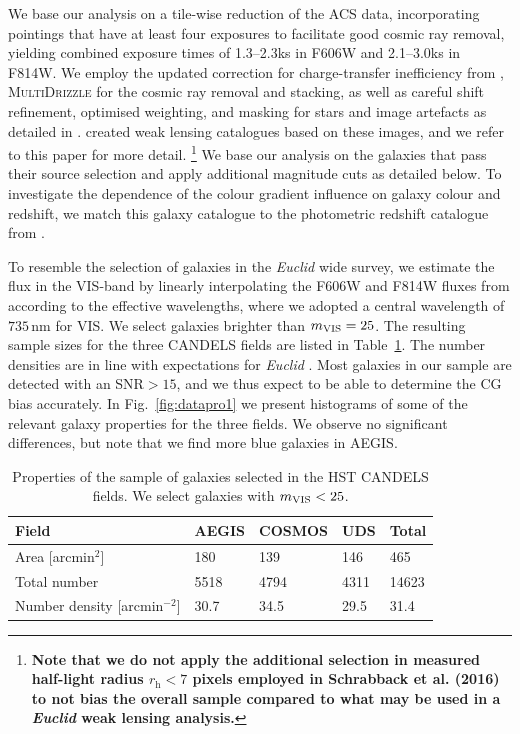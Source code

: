 \documentclass[useAMS,usenatbib]{mnras}
\newcommand{\be}{\begin{equation}}
\newcommand{\ee}{\end{equation}}
\begin{document}
We base our analysis on a tile-wise reduction of the ACS data, incorporating pointings that have at least four exposures to facilitate good cosmic ray removal, yielding combined exposure times of 1.3--2.3ks in F606W and 2.1--3.0ks in F814W.  We employ the updated correction for charge-transfer inefficiency from \cite{massey2014}, \textsc{MultiDrizzle} \citep{koekemoer2003} for the cosmic ray removal and stacking, as well as careful shift refinement, optimised weighting, and masking for stars and image artefacts as detailed in \cite{Schrabback10}. \cite{Schrabback16} created weak lensing catalogues based on these images, and we refer to this paper for more detail. \footnote{\bf Note that we do not apply the additional selection in measured half-light radius \mbox{$r_\mathrm{h}<7$} pixels employed in Schrabback et al. (2016) to not bias the overall sample compared to what may be used in a {\it Euclid} weak lensing analysis.}  We base our analysis on the galaxies that pass their source selection and apply additional magnitude cuts as detailed below. To investigate the dependence of the colour gradient influence on galaxy colour and redshift, we match this galaxy catalogue to the photometric redshift catalogue from \cite{skelton14}.

To resemble the selection of galaxies in the {\it Euclid} wide survey,
we estimate the flux in the VIS-band by linearly
interpolating the F606W and F814W fluxes from \cite{skelton14}
according to the effective wavelengths, where we adopted a central
wavelength of $735$\,nm for VIS.
We select galaxies brighter than $m_{\rm VIS}=25$.  The resulting sample sizes for the  three CANDELS fields are listed in Table~\ref{table:mag}. The number densities are in line with expectations for {\it Euclid} \citep{Laureijs11}.
Most galaxies in our sample are detected with an SNR$>15$, and we thus  expect to be able to determine the CG bias accurately.  In Fig.~\ref{fig:datapro1} we present histograms of some of the relevant galaxy properties for the three fields. We observe no significant differences, but note that we find more blue galaxies in AEGIS.

\begin{center}
\begin{table}
  \begin{tabular}{lllll}
    \hline
    Field               &AEGIS   &COSMOS   &UDS  &Total\\
    \hline
    Area [arcmin$^2$]  	 		&180      & 139     &146    & 465\\
    Total number                 		 	& 5518    & 4794  & 4311  &14623\\
    Number density [arcmin$^{-2}$]     & 30.7    & 34.5   & 29.5   &31.4\\
    \hline
  \end{tabular}
  \caption{\label{table:mag}
Properties of the sample of galaxies selected in the HST CANDELS fields. We
select galaxies with $m_{\rm VIS}<25$.}
\end{table}
\end{center}
%
\end{document}
